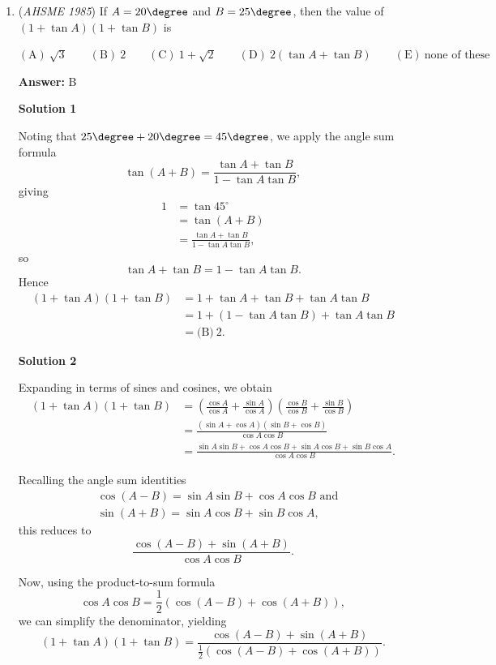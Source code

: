 \begin{enumerate}
	\item (\textit{AHSME 1985}) If $ A = 20 \degree$ and $ B = 25 \degree$, then the value of $\left(1+\tan A\right)\left(1+\tan B\right)$ is


 $\mathrm{(A)\ } \sqrt{3} \qquad \mathrm{(B) \ }2 \qquad \mathrm{(C) \  } 1+\sqrt{2} \qquad \mathrm{(D) \  } 2\left(\tan A+\tan B\right) \qquad \mathrm{(E) \  }\text{none of these}$

 \textbf{Answer: }B



\textbf{Solution 1}

Noting that $ 25 \degree + 20 \degree = 45 \degree$, we apply the angle sum formula 
 \[\tan(A+B) = \frac{\tan A+\tan B}{1-\tan A\tan B},\] giving 
 \begin{align*}1 &= \tan 45^{\circ} \\ &= \tan(A+B) \\ &= \frac{\tan A+\tan B}{1-\tan A\tan B},\end{align*}
 so 
 \[\tan A + \tan B = 1-\tan A\tan B.\] Hence 
 \begin{align*}(1+\tan A)(1+\tan B) &= 1+\tan A+\tan B+\tan A\tan B \\ &= 1+\left(1-\tan A\tan B\right)+\tan A\tan B \\ &= \boxed{\text{(B)} \ 2}.\end{align*}





\textbf{Solution 2}

Expanding in terms of sines and cosines, we obtain 
 \begin{align*}\left(1+\tan A\right)\left(1+\tan B\right) &= \left(\frac{\cos A}{\cos A}+\frac{\sin A}{\cos A}\right)\left(\frac{\cos B}{\cos B}+\frac{\sin B}{\cos B}\right) \\ &=\frac{\left(\sin A+\cos A\right)\left(\sin B+\cos B\right)}{\cos A\cos B} \\ &= \frac{\sin A\sin B+\cos A\cos B+\sin A\cos B+\sin B\cos A}{\cos A\cos B}.\end{align*}


 Recalling the angle sum identities 
 \begin{align*}&\cos(A-B) = \sin A\sin B+\cos A\cos B \text{ and} \\ &\sin(A+B)=\sin A\cos B+\sin B\cos A,\end{align*}
 this reduces to 
 \[\frac{\cos(A-B)+\sin(A+B)}{\cos A\cos B}.\]

 Now, using the product-to-sum formula 
 \[\cos A\cos B = \frac{1}{2}\left(\cos(A-B)+\cos(A+B)\right),\] we can simplify the denominator, yielding 
 \[\left(1+\tan A\right)\left(1+\tan B\right) = \frac{\cos(A-B)+\sin(A+B)}{\frac{1}{2}\left(\cos(A-B)+\cos(A+B)\right)}.\]


\end{enumerate}
